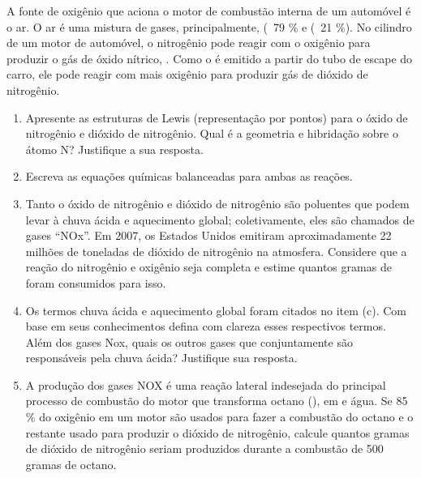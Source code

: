 A fonte de oxigênio que aciona o motor de combustão interna de um automóvel é o ar. O ar é uma mistura de gases, principalmente,  (~79 $\%$ e  (~21 $\%$). No cilindro de um motor de automóvel, o nitrogênio pode reagir com o oxigênio para produzir o gás de óxido nítrico, . Como o  é emitido a partir do tubo de escape do carro, ele pode reagir com mais oxigênio para produzir gás de dióxido de nitrogênio. 
\begin{enumerate}[label = (\alph*)]
	\item Apresente as estruturas de Lewis (representação por pontos) para o óxido de nitrogênio e dióxido de nitrogênio. Qual é a geometria e hibridação sobre o átomo N? Justifique a sua resposta. 
	\item Escreva as equações químicas balanceadas para ambas as reações. 
	\item Tanto o óxido de nitrogênio e dióxido de nitrogênio são poluentes que podem levar à chuva ácida e aquecimento global; coletivamente, eles são chamados de gases “NOx”. Em 2007, os Estados Unidos emitiram aproximadamente 22 milhões de toneladas de dióxido de nitrogênio na atmosfera. Considere que a reação do nitrogênio e oxigênio seja completa e estime quantos gramas de  foram consumidos para isso. 
	\item Os termos chuva ácida e aquecimento global foram citados no item (c). Com base em seus conhecimentos defina com clareza esses respectivos termos. Além dos gases Nox, quais os outros gases que conjuntamente são responsáveis pela chuva ácida? Justifique sua resposta. 
	\item  A produção dos gases NOX é uma reação lateral indesejada do principal processo de combustão do motor que transforma octano (), em  e água. Se 85 $\%$ do oxigênio em um motor são usados para fazer a combustão do octano e o restante usado para produzir o dióxido de nitrogênio, calcule quantos gramas de dióxido de nitrogênio seriam produzidos durante a combustão de 500 gramas de octano.
\end{enumerate}